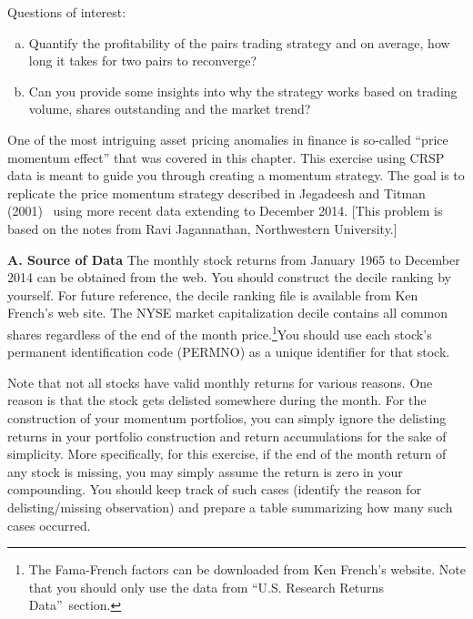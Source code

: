 \noindent Questions of interest:
	\begin{enumerate}[(a)]
	\item Quantify the profitability of the pairs trading strategy and on average, how long it takes for two pairs to reconverge?
	\item Can you provide some insights into why the strategy works based on trading volume, shares outstanding and the market trend? \twomedskip
	\end{enumerate}


\prob One of the most intriguing asset pricing anomalies in finance is so-called  ``price momentum effect'' that was covered in this chapter. This exercise using CRSP data is meant to guide you through creating a momentum strategy. The goal is to replicate the price momentum strategy described in Jegadeesh and Titman (2001)~\cite{JeTi} using more recent data extending to December 2014. [This problem is based on the notes from Ravi Jagannathan, Northwestern University.] \twomedskip

\textbf{A. Source of Data}
The monthly stock returns from January 1965 to December 2014 can be obtained from the web. You should construct the decile ranking by yourself. For future reference, the decile ranking file is available from Ken French's web site. The NYSE market capitalization decile contains all common shares regardless of the end of the month price.\footnote{The Fama-French factors can be downloaded from Ken French's website. Note that you should only use the data from \textquotedblleft U.S. Research Returns Data\textquotedblright\ section.}You should use each stock's permanent identification code (PERMNO) as a unique identifier for that stock.

Note that not all stocks have valid monthly returns for various reasons. One reason is that the stock gets delisted somewhere during the month. For the construction of your momentum portfolios, you can simply ignore the delisting returns in your portfolio construction and return accumulations for the sake of simplicity. More specifically, for this exercise, if the end of the month return of any stock is missing, you may simply assume the return is zero in your compounding. You should keep track of such cases (identify the reason for delisting/missing observation) and prepare a table summarizing how many such cases occurred. \twomedskip

